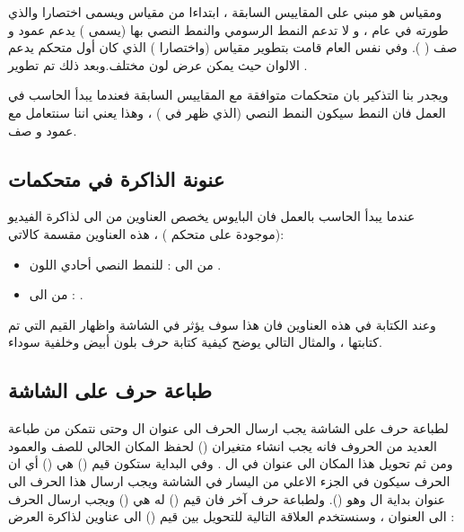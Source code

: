 \documentclass[document.tex]{subfiles}
\begin{document}
ومقياس  هو مبني على المقاييس السابقة ، ابتداءا من مقياس  ويسمى اختصارا  والذي طورته  في عام  ، و  لا تدعم النمط الرسومي والنمط النصي بها (يسمى ) يدعم  عمود و  صف ( ). وفي نفس العام قامت  بتطوير مقياس  (واختصارا ) الذي كان أول متحكم يدعم الالوان حيث يمكن عرض  لون مختلف.وبعد ذلك تم تطوير .

ويجدر بنا التذكير بان متحكمات  متوافقة مع المقاييس السابقة  فعندما يبدأ الحاسب في العمل فان النمط سيكون النمط النصي  (الذي ظهر في ) ، وهذا يعني اننا سنتعامل مع  عمود و  صف.


\subsection{عنونة الذاكرة في متحكمات }

عندما يبدأ الحاسب بالعمل فان البايوس يخصص العناوين من  الى  لذاكرة الفيديو  (موجودة على متحكم ) ، هذه العناوين مقسمة كالاتي:

\begin{itemize}
\item من  الى : للنمط النصي أحادي اللون .
\item من  الى : .
\end{itemize}

وعند الكتابة في هذه العناوين فان هذا سوف يؤثر في الشاشة واظهار القيم التي تم كتابتها ، والمثال التالي يوضح كيفية كتابة حرف  بلون أبيض وخلفية سوداء.

\begin{english}
\lstset{numberstyle=\tiny,numbers=left,stepnumber=1,numbersep=5pt,tabsize=2,extendedchars=true,breaklines=true,frame=b,showspaces=false, showtabs=false,xleftmargin=10pt,framexleftmargin=10pt,framexrightmargin=5pt,framexbottommargin=4pt,showstringspaces=false,language=[x86masm]Assembler}


\end{english}

\subsection{طباعة حرف على الشاشة}
لطباعة حرف على الشاشة يجب ارسال الحرف الى عنوان ال  وحتى نتمكن من طباعة العديد من الحروف فانه يجب انشاء متغيران () لحفظ المكان الحالي للصف والعمود ومن ثم تحويل هذا المكان الى عنوان في ال . وفي البداية ستكون قيم () هي () أي ان الحرف سيكون في الجزء الاعلي من اليسار في الشاشة ويجب ارسال هذا الحرف الى عنوان بداية ال  وهو  (). ولطباعة حرف آخر فان قيم () له هي ()  ويجب ارسال الحرف الى العنوان  ، وسنستخدم العلاقة التالية للتحويل بين قيم () الى عناوين لذاكرة العرض :
\end{document}
